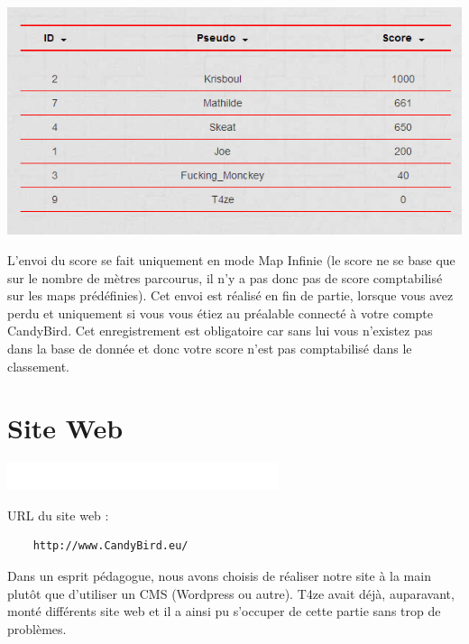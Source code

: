 \documentclass [11pt]{report}
\begin{document}
	\begin{center}
		\includegraphics[scale = 0.6]{images/classement.png}
	\end{center}
			
	
	
	\vspace{10mm}

	L'envoi du score se fait uniquement en mode Map Infinie (le score ne se base que sur le nombre de mètres parcourus, il n'y a pas donc pas de score comptabilisé sur les maps prédéfinies). Cet envoi est réalisé en fin de partie, lorsque vous avez perdu et uniquement si vous vous étiez au préalable connecté à votre compte CandyBird. Cet enregistrement est obligatoire car sans lui vous n'existez pas dans la base de donnée et donc votre score n'est pas comptabilisé dans le classement.
	 
	 \newpage
	 
	\section{Site Web}
	
	\begin{center}
				\includegraphics[scale = 0.3]{images/blanc.png}
			\end{center}
	
	\noindent URL du site web : 
	\begin{Verbatim}
	http://www.CandyBird.eu/
	\end{Verbatim}
	
	\vspace{6mm}
	
	Dans un esprit pédagogue, nous avons choisis de réaliser notre site à la main plutôt que d'utiliser un CMS (Wordpress ou autre). T4ze avait déjà, auparavant, monté différents site web et il a ainsi pu s'occuper de cette partie sans trop de problèmes.
	
\end{document}
